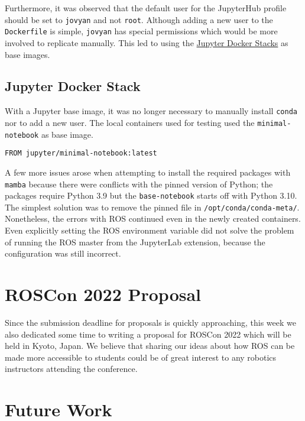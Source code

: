     Furthermore, it was observed that the default user for the JupyterHub profile should be set to \texttt{jovyan} and not \texttt{root}. Although adding a new user to the \texttt{Dockerfile} is simple, \texttt{jovyan} has special permissions which would be more involved to replicate manually. This led to using the \href{https://jupyter-docker-stacks.readthedocs.io/en/latest/index.html}{Jupyter Docker Stacks} as base images.


    \subsection{Jupyter Docker Stack}

    With a Jupyter base image, it was no longer necessary to manually install \texttt{conda} nor to add a new user. The local containers used for testing used the \texttt{minimal-notebook} as base image.


    \begin{lstlisting}[language=docker]
FROM jupyter/minimal-notebook:latest
    \end{lstlisting}

    A few more issues arose when attempting to install the required packages with \texttt{mamba} because there were conflicts with the pinned version of Python; the packages require Python 3.9 but the \texttt{base-notebook} starts off with Python 3.10. The simplest solution was to remove the pinned file in \texttt{/opt/conda/conda-meta/}.
    Nonetheless, the errors with ROS continued even in the newly created containers. Even explicitly setting the ROS environment variable did not solve the problem of running the ROS master from the JupyterLab extension, because the configuration was still incorrect.

\section{ROSCon 2022 Proposal}

    Since the submission deadline for proposals is quickly approaching, this week we also dedicated some time to writing a proposal for ROSCon 2022 which will be held in Kyoto, Japan. We believe that sharing our ideas about how ROS can be made more accessible to students could be of great interest to any robotics instructors attending the conference.

\section{Future Work}

